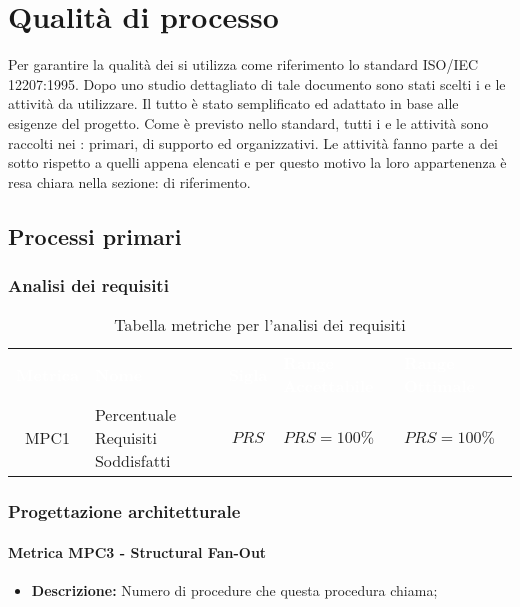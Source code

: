 \section{Qualità di processo}
Per garantire la qualità dei  si utilizza come riferimento lo standard ISO/IEC 12207:1995. Dopo uno studio dettagliato di tale documento sono stati scelti i 
e le attività da utilizzare. Il tutto è stato semplificato ed adattato in base alle esigenze del progetto. Come è previsto nello standard, tutti i  e le attività sono raccolti 
nei : primari, di supporto ed organizzativi. Le attività fanno parte a dei sotto  rispetto a quelli appena elencati e per questo motivo la loro 
appartenenza è resa chiara nella sezione:  di riferimento.

\subsection{Processi primari}

\subsubsection{Analisi dei requisiti}
   \renewcommand{\arraystretch}{1.5}
   \begin{longtable}{ c C{4cm} c C{3.5cm} C{3.5cm}}
   	\caption{Tabella metriche per l'analisi dei requisiti}\\
   	\textcolor{white}{\textbf{Metrica}} & \textcolor{white}{\textbf{Nome}} & \textcolor{white}{\textbf{Sigla}} & \textcolor{white}{\textbf{Range Accettabile}} & \textcolor{white}{\textbf{Range Ottimale}}\\
   	MPC1 & Percentuale Requisiti Soddisfatti & $PRS$ & $PRS = 100\%$ & $PRS = 100\%$ \\
   \end{longtable}
\vspace{0.3cm}
\subsubsection{Progettazione architetturale}
\paragraph{Metrica MPC3 - Structural Fan-Out}
\begin{itemize}
	\item \textbf{Descrizione:} Numero di procedure che questa procedura chiama;
\end{itemize}
\vspace{0.3cm}
